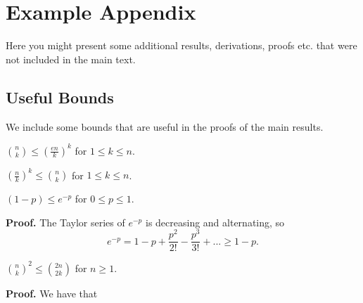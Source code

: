 \chapter{Example Appendix}

Here you might present some additional results, derivations, proofs etc. that were not included in the main text.

\section{Useful Bounds}

We include some bounds that are useful in the proofs of the main results.

\begin{proposition}\label{ap:prop:upperbinom}
    $\binom{n}{k} \leq \left(\frac{en}{k}\right)^k$ for $1 \leq k \leq n$. 
\end{proposition}

\begin{proposition}\label{ap:prop:lowebinom}
    $\left(\frac{n}{k}\right)^k \leq \binom{n}{k}$ for $1 \leq k \leq n$.
\end{proposition}

\begin{proposition}\label{ap:prop:exp}
    $(1 - p) \leq e^{-p}$ for $0 \leq p \leq 1$.
\end{proposition}

\textbf{Proof. } The Taylor series of $e^{-p}$ is decreasing and alternating, so
\[e^{-p} = 1 - p + \frac{p^2}{2!} - \frac{p^3}{3!} + ... \geq 1 - p.\]

\begin{proposition}
    $\binom{n}{k}^2 \leq \binom{2n}{2k}$ for $n \geq 1$. 
\end{proposition}

\textbf{Proof. } We have that